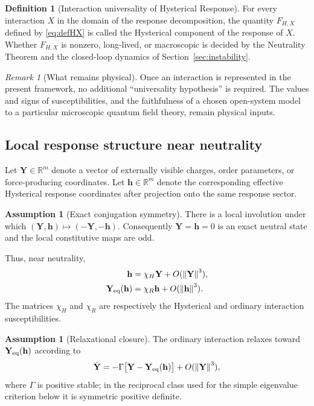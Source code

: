 \documentclass[11pt]{article}
\theoremstyle{definition}
\newtheorem{definition}[theorem]{Definition}
\newtheorem{assumption}[theorem]{Assumption}
\theoremstyle{remark}
\newtheorem{remark}[theorem]{Remark}
\newcommand{\R}{\mathbb R}
\newcommand{\norm}[1]{\left\lVert #1\right\rVert}
\newcommand{\Y}{\mathbf{Y}}
\newcommand{\h}{\mathbf{h}}
\newcommand{\Gm}{\Gamma}
\newcommand{\chiR}{\chi_{R}}
\newcommand{\chiH}{\chi_{H}}
\begin{document}
\begin{definition}[Interaction universality of Hysterical Response]\label{def:univ}
For every interaction $X$ in the domain of the response decomposition, the quantity $F_{H,X}$ defined by \eqref{eq:defHX} is called the Hysterical component of the response of $X$.
Whether $F_{H,X}$ is nonzero, long-lived, or macroscopic is decided by the Neutrality Theorem and the closed-loop dynamics of Section~\ref{sec:instability}.
\end{definition}

\begin{remark}[What remains physical]
Once an interaction is represented in the present framework, no additional ``universality hypothesis'' is required.
The values and signs of susceptibilities, and the faithfulness of a chosen open-system model to a particular microscopic quantum field theory, remain physical inputs.
\end{remark}

\subsection{Local response structure near neutrality}
Let $\Y\in\R^m$ denote a vector of externally visible charges, order parameters, or force-producing coordinates.  Let $\h\in\R^m$ denote the corresponding effective Hysterical response coordinates after projection onto the same response sector.

\begin{assumption}[Exact conjugation symmetry]\label{ass:symmetry}
There is a local involution under which $(\Y,\h)\mapsto(-\Y,-\h)$.  Consequently $\Y=\h=0$ is an exact neutral state and the local constitutive maps are odd.
\end{assumption}

Thus, near neutrality,
\begin{align}
 \h &= \chiH\Y+O(\norm{\Y}^3), \label{eq:hchi}\\
 \Y_{\rm eq}(\h) &= \chiR\h+O(\norm{\h}^3). \label{eq:rchi}
\end{align}
The matrices $\chiH$ and $\chiR$ are respectively the Hysterical and ordinary interaction susceptibilities.

\begin{assumption}[Relaxational closure]\label{ass:relax}
The ordinary interaction relaxes toward $\Y_{\rm eq}(\h)$ according to
\begin{equation}
 \dot{\Y}=-\Gm\bigl[\Y-\Y_{\rm eq}(\h)\bigr]+O(\norm{\Y}^3),
 \label{eq:relax}
\end{equation}
where $\Gm$ is positive stable; in the reciprocal class used for the simple eigenvalue criterion below it is symmetric positive definite.
\end{assumption}
\end{document}
